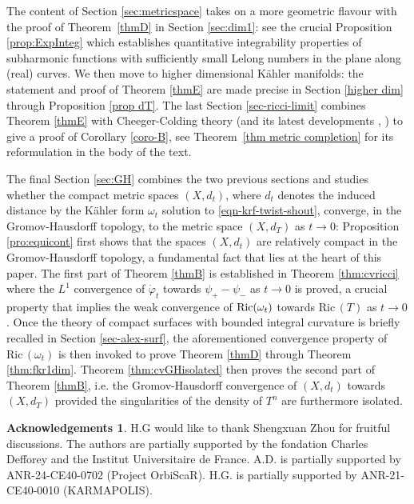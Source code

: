\documentclass[a4paper,11pt,leqno,english]{smfart}
\theoremstyle{plain}
\theoremstyle{plain}
\numberwithin{equation}{section} %
\numberwithin{figure}{section} %
\theoremstyle{plain}
\theoremstyle{plain}
\theoremstyle{remark}
\theoremstyle{remark}
\theoremstyle{definition}
\theoremstyle{plain}
\theoremstyle{plain}
\theoremstyle{definition}
\newtheorem*{ackn}{Acknowledgements}
\newcommand{\Ric}{\mathrm{Ric} \,}
\begin{document}

The content of Section \ref{sec:metricspace} takes on a more geometric flavour with the proof of Theorem~\ref{thmD} in Section \ref{sec:dim1}: see the crucial Proposition \ref{prop:ExpInteg} which establishes quantitative integrability properties of subharmonic functions with sufficiently small Lelong numbers in the plane along (real) curves. We then move to higher dimensional K\"ahler manifolds: the statement and proof of Theorem \ref{thmE} are made precise in Section \ref{higher dim} through Proposition \ref{prop dT}. The last Section \ref{sec-ricci-limit} combines Theorem \ref{thmE}  with Cheeger-Colding theory (and its latest developments \cite{CJN}, \cite{LS18}) to give a proof of Corollary \ref{coro-B}, see Theorem~\ref{thm metric completion} for its reformulation in the body of the text.


The final Section \ref{sec:GH} combines the two previous sections  and studies whether the compact metric spaces
$(X,d_t)$, where $d_t$ denotes the induced distance by the K\"ahler form $\omega_t$ solution to \eqref{eqn-krf-twist-shout}, converge, in the Gromov-Hausdorff topology, to the metric space $(X,d_T)$
as $t \rightarrow 0$: Proposition \ref{pro:equicont} first shows that the   spaces
$(X,d_t)$ are relatively compact in the Gromov-Hausdorff topology, a fundamental fact that lies at the heart of this paper. 
The first part of Theorem \ref{thmB} is established in Theorem \ref{thm:cvricci} where  the $L^1$ convergence of $\dot{\varphi}_t$ towards $\psi_+-\psi_{-}$ as $t \rightarrow 0$ is proved, a crucial property that implies the weak convergence of ${\rm Ric}(\omega_t)$ towards $\Ric(T)$ as $t \rightarrow 0$. Once the theory of compact surfaces with bounded integral curvature is briefly recalled in Section \ref{sec-alex-surf}, 
the aforementioned convergence property of $\Ric(\omega_t)$ is then invoked to prove Theorem \ref{thmD} through Theorem \ref{thm:fkr1dim}. 
Theorem \ref{thm:cvGHisolated} then proves the second part of Theorem \ref{thmB}, i.e. the Gromov-Hausdorff convergence of $(X,d_t)$ towards $(X,d_T)$ provided the singularities of the density of $T^n$ are furthermore isolated. 


 \begin{ackn} 
 H.G would like to thank Shengxuan Zhou for fruitful discussions. 
 The authors are partially supported by the fondation Charles Defforey
and the Institut Universitaire de France.
 A.D. is partially supported by  ANR-24-CE40-0702 (Project OrbiScaR). 
 H.G. is partially supported by ANR-21-CE40-0010 (KARMAPOLIS). 
\end{ackn}
\end{document}
